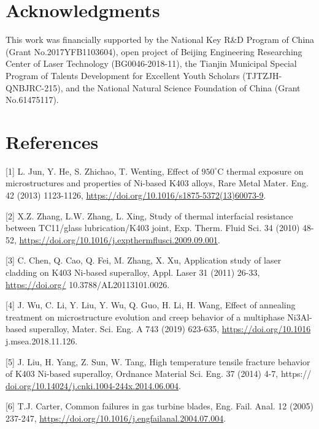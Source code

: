 \documentclass[10pt]{article}
\begin{document}
\section*{Acknowledgments}
This work was financially supported by the National Key R\&D Program of China (Grant No.2017YFB1103604), open project of Beijing Engineering Researching Center of Laser Technology (BG0046-2018-11), the Tianjin Municipal Special Program of Talents Development for Excellent Youth Scholars (TJTZJH-QNBJRC-215), and the National Natural Science Foundation of China (Grant No.61475117).

\section*{References}
[1] L. Jun, Y. He, S. Zhichao, T. Wenting, Effect of $950^{\circ} \mathrm{C}$ thermal exposure on microstructures and properties of Ni-based K403 alloys, Rare Metal Mater. Eng. 42 (2013) 1123-1126, \href{https://doi.org/10.1016/s1875-5372(13)60073-9}{https://doi.org/10.1016/s1875-5372(13)60073-9}.

[2] X.Z. Zhang, L.W. Zhang, L. Xing, Study of thermal interfacial resistance between TC11/glass lubrication/K403 joint, Exp. Therm. Fluid Sci. 34 (2010) 48-52, \href{https://doi.org/10.1016/j.expthermflusci.2009.09.001}{https://doi.org/10.1016/j.expthermflusci.2009.09.001}.

[3] C. Chen, Q. Cao, Q. Fei, M. Zhang, X. Xu, Application study of laser cladding on K403 Ni-based superalloy, Appl. Laser 31 (2011) 26-33, \href{https://doi.org/}{https://doi.org/} 10.3788/AL20113101.0026.

[4] J. Wu, C. Li, Y. Liu, Y. Wu, Q. Guo, H. Li, H. Wang, Effect of annealing treatment on microstructure evolution and creep behavior of a multiphase $\mathrm{Ni} 3 \mathrm{Al}$-based superalloy, Mater. Sci. Eng. A 743 (2019) 623-635, \href{https://doi.org/10.1016}{https://doi.org/10.1016} j.msea.2018.11.126.

[5] J. Liu, H. Yang, Z. Sun, W. Tang, High temperature tensile fracture behavior of K403 Ni-based superalloy, Ordnance Material Sci. Eng. 37 (2014) 4-7, https:// \href{http://doi.org/10.14024/j.cnki.1004-244x.2014.06.004}{doi.org/10.14024/j.cnki.1004-244x.2014.06.004}.

[6] T.J. Carter, Common failures in gas turbine blades, Eng. Fail. Anal. 12 (2005) 237-247, \href{https://doi.org/10.1016/j.engfailanal.2004.07.004}{https://doi.org/10.1016/j.engfailanal.2004.07.004}.
\end{document}
